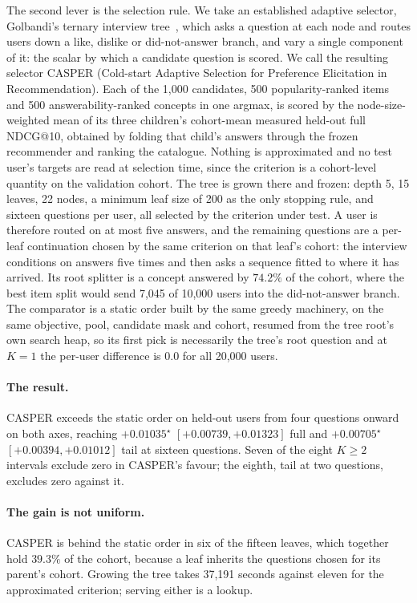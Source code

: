 \documentclass[runningheads]{llncs}
\begin{document}
The second lever is the selection rule. We take an established adaptive selector, Golbandi's
ternary interview tree~\cite{golbandi2011adaptive}, which asks a question at each node and routes
users down a like, dislike or did-not-answer branch, and vary a single component of it: the scalar by
which a candidate question is scored. We call the resulting selector CASPER (Cold-start Adaptive Selection for Preference Elicitation in
Recommendation). Each of the 1{,}000 candidates, 500
popularity-ranked items and 500 answerability-ranked concepts in one argmax, is scored by the
node-size-weighted mean of its three children's cohort-mean measured held-out full NDCG@10, obtained
by folding that child's answers through the frozen recommender and ranking the catalogue. Nothing is
approximated and no test user's targets are read at selection time, since the criterion is a cohort-level
quantity on the validation cohort. The tree is grown there and frozen: depth 5, 15 leaves, 22 nodes,
a minimum leaf size of 200 as the only stopping rule, and sixteen questions per user, all selected by
the criterion under test. A user is therefore routed on at most five answers, and the remaining
questions are a per-leaf continuation chosen by the same criterion on that leaf's cohort: the
interview conditions on answers five times and then asks a sequence fitted to where it has arrived. Its root splitter is a concept answered by $74.2\%$ of the cohort, where
the best item split would send 7{,}045 of 10{,}000 users into the did-not-answer branch. The
comparator is a static order built by the same greedy machinery, on the same objective, pool,
candidate mask and cohort, resumed from the tree root's own search heap, so its first pick is
necessarily the tree's root question and at $K{=}1$ the per-user difference is $0.0$ for all
20{,}000 users.


\paragraph{The result.}
CASPER exceeds the static order on held-out users from four questions onward on both axes, reaching
$+0.01035^\star$ $[+0.00739,+0.01323]$ full and $+0.00705^\star$ $[+0.00394,+0.01012]$ tail at
sixteen questions. Seven of the eight $K\ge2$ intervals exclude zero in CASPER's favour; the eighth,
tail at two questions, excludes zero against it.

\paragraph{The gain is not uniform.}
CASPER is behind the static order in six of the fifteen leaves, which together hold $39.3\%$ of
the cohort, because a leaf inherits the questions chosen for its parent's cohort. Growing the tree
takes 37{,}191 seconds against eleven for the approximated criterion; serving either is a lookup.
\end{document}
